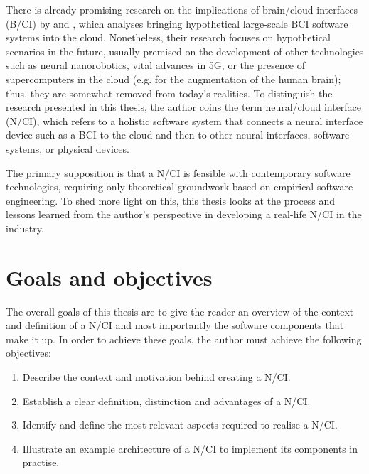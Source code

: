 There is already promising research on the implications of brain/cloud interfaces (B/CI) by \citeauthor{martins_human_2019} \parencite*{martins_human_2019} and \citeauthor{angelica_cognitive_2021} \parencite*{angelica_cognitive_2021}, which analyses bringing hypothetical large-scale BCI software systems into the cloud. Nonetheless, their research focuses on hypothetical scenarios in the future, usually premised on the development of other technologies such as neural nanorobotics, vital advances in 5G, or the presence of supercomputers in the cloud (e.g. for the augmentation of the human brain); thus, they are somewhat removed from today’s realities. To distinguish the research presented in this thesis, the author coins the term neural/cloud interface (N/CI), which refers to a holistic software system that connects a neural interface device such as a BCI to the cloud and then to other neural interfaces, software systems, or physical devices.

The primary supposition is that a N/CI is feasible with contemporary software technologies, requiring only theoretical groundwork based on empirical software engineering. To shed more light on this, this thesis looks at the process and lessons learned from the author's perspective in developing a real-life N/CI in the industry.

\section{Goals and objectives}
\label{chapter1-goals-and-objectives}

The overall goals of this thesis are to give the reader an overview of the context and definition of a N/CI and most importantly the software components that make it up. In order to achieve these goals, the author must achieve the following objectives:

\begin{enumerate}
  \item Describe the context and motivation behind creating a N/CI.
  \item Establish a clear definition, distinction and advantages of a N/CI.
  \item Identify and define the most relevant aspects required to realise a N/CI.
  \item Illustrate an example architecture of a N/CI to implement its components in practise.
\end{enumerate}

